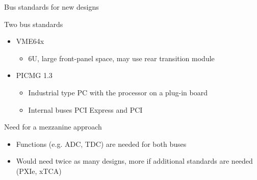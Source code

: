 \documentclass[compress,red]{beamer}
\begin{document}
\begin{frame}{Bus standards for new designs}
	\begin{block}{Two bus standards}
	  \begin{itemize}
		\item VME64x
		      \begin{itemize}
			\item 6U, large front-panel space, may use rear transition module
		       \end{itemize}
		\item PICMG 1.3
		      \begin{itemize}
			\item Industrial type PC with the processor on a plug-in board
			\item Internal buses PCI Express and PCI
		       \end{itemize}
	   \end{itemize}
	\end{block}

	\begin{block}{Need for a mezzanine approach}
	  \begin{itemize}
		\item Functions (e.g. ADC, TDC) are needed for both buses
		\item Would need twice as many designs, more if additional standards are needed (PXIe, xTCA)
	   \end{itemize}
	\end{block}
\end{frame}
\end{document}

